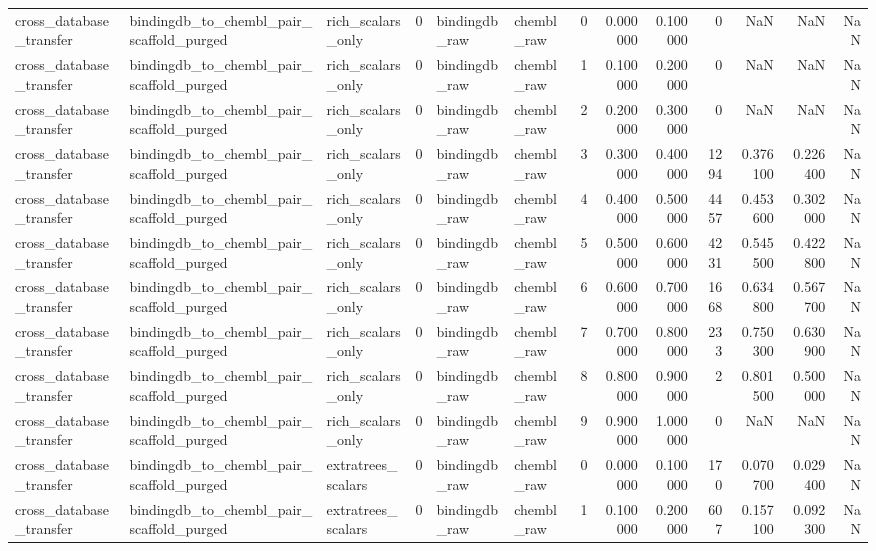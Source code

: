 \begin{longtable}{lllrllrrrrrrr}
cross\_database\_transfer & bindingdb\_to\_chembl\_pair\_scaffold\_purged & rich\_scalars\_only & 0 & bindingdb\_raw & chembl\_raw & 0 & 0.000000 & 0.100000 & 0 & NaN & NaN & NaN \\
cross\_database\_transfer & bindingdb\_to\_chembl\_pair\_scaffold\_purged & rich\_scalars\_only & 0 & bindingdb\_raw & chembl\_raw & 1 & 0.100000 & 0.200000 & 0 & NaN & NaN & NaN \\
cross\_database\_transfer & bindingdb\_to\_chembl\_pair\_scaffold\_purged & rich\_scalars\_only & 0 & bindingdb\_raw & chembl\_raw & 2 & 0.200000 & 0.300000 & 0 & NaN & NaN & NaN \\
cross\_database\_transfer & bindingdb\_to\_chembl\_pair\_scaffold\_purged & rich\_scalars\_only & 0 & bindingdb\_raw & chembl\_raw & 3 & 0.300000 & 0.400000 & 1294 & 0.376100 & 0.226400 & NaN \\
cross\_database\_transfer & bindingdb\_to\_chembl\_pair\_scaffold\_purged & rich\_scalars\_only & 0 & bindingdb\_raw & chembl\_raw & 4 & 0.400000 & 0.500000 & 4457 & 0.453600 & 0.302000 & NaN \\
cross\_database\_transfer & bindingdb\_to\_chembl\_pair\_scaffold\_purged & rich\_scalars\_only & 0 & bindingdb\_raw & chembl\_raw & 5 & 0.500000 & 0.600000 & 4231 & 0.545500 & 0.422800 & NaN \\
cross\_database\_transfer & bindingdb\_to\_chembl\_pair\_scaffold\_purged & rich\_scalars\_only & 0 & bindingdb\_raw & chembl\_raw & 6 & 0.600000 & 0.700000 & 1668 & 0.634800 & 0.567700 & NaN \\
cross\_database\_transfer & bindingdb\_to\_chembl\_pair\_scaffold\_purged & rich\_scalars\_only & 0 & bindingdb\_raw & chembl\_raw & 7 & 0.700000 & 0.800000 & 233 & 0.750300 & 0.630900 & NaN \\
cross\_database\_transfer & bindingdb\_to\_chembl\_pair\_scaffold\_purged & rich\_scalars\_only & 0 & bindingdb\_raw & chembl\_raw & 8 & 0.800000 & 0.900000 & 2 & 0.801500 & 0.500000 & NaN \\
cross\_database\_transfer & bindingdb\_to\_chembl\_pair\_scaffold\_purged & rich\_scalars\_only & 0 & bindingdb\_raw & chembl\_raw & 9 & 0.900000 & 1.000000 & 0 & NaN & NaN & NaN \\
cross\_database\_transfer & bindingdb\_to\_chembl\_pair\_scaffold\_purged & extratrees\_scalars & 0 & bindingdb\_raw & chembl\_raw & 0 & 0.000000 & 0.100000 & 170 & 0.070700 & 0.029400 & NaN \\
cross\_database\_transfer & bindingdb\_to\_chembl\_pair\_scaffold\_purged & extratrees\_scalars & 0 & bindingdb\_raw & chembl\_raw & 1 & 0.100000 & 0.200000 & 607 & 0.157100 & 0.092300 & NaN \\

\end{longtable}
